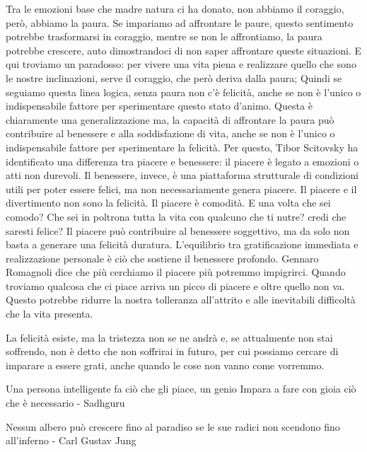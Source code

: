 \documentclass[12pt]{book} %
\begin{document}
Tra le emozioni base che madre natura ci ha donato, non abbiamo il coraggio, però, abbiamo la paura. Se impariamo ad
affrontare le paure, questo sentimento potrebbe trasformarsi in coraggio, mentre se non le affrontiamo, la paura potrebbe crescere, auto dimostrandoci di non saper affrontare queste situazioni. E qui troviamo un paradosso: per vivere una vita piena e
realizzare quello che sono le nostre inclinazioni, serve il coraggio, che però deriva dalla paura; Quindi se seguiamo
questa linea logica, senza paura non c'è felicità, anche se non è l’unico o indispensabile fattore per sperimentare questo stato d'animo. Questa è chiaramente una generalizzazione ma, la capacità di affrontare la paura può contribuire al benessere e alla soddisfazione di vita, anche se non è l’unico o indispensabile fattore per sperimentare la felicità. Per questo, Tibor Scitovsky ha identificato una differenza tra
piacere e benessere: il piacere è legato a emozioni o atti non durevoli. Il benessere, invece, è una piattaforma
strutturale di condizioni utili per poter essere felici, ma non necessariamente genera piacere. 
Il piacere e il divertimento non sono la felicità. Il piacere è comodità. E una volta che sei comodo? Che sei in poltrona tutta la vita con qualcuno che ti nutre? credi che saresti felice?
Il piacere può contribuire al benessere soggettivo, ma da solo non basta a generare una felicità duratura. L’equilibrio tra gratificazione immediata e realizzazione personale è ciò che sostiene il benessere profondo.
Gennaro Romagnoli dice che più cerchiamo il piacere più potremmo impigrirci. Quando troviamo qualcosa che ci piace arriva un picco di piacere e oltre quello non va. Questo potrebbe ridurre la nostra tolleranza all'attrito e alle inevitabili difficoltà che la vita presenta.

La felicità esiste, ma la tristezza non se ne andrà e, se attualmente non stai soffrendo, non è detto che non soffrirai in futuro, per cui possiamo cercare di imparare a essere grati, anche quando le cose non vanno come vorremmo. 

Una persona intelligente fa ciò che gli piace, un genio Impara a fare con gioia ciò che è necessario - Sadhguru

Nessun albero può crescere fino al paradiso se le sue radici non scendono fino all'inferno - Carl Gustav Jung
\end{document}
